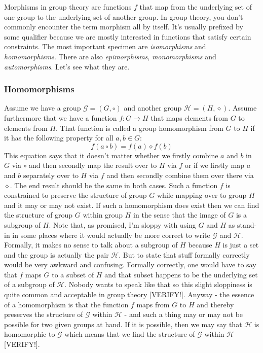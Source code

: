 Morphisms in group theory are functions $f$ that map from the underlying set of one group to the underlying set of another group. In group theory, you don't commonly encounter the term morphism all by itself. It's usually prefixed by some qualifier because we are mostly interested in functions that satisfy certain constraints. The most important specimen are \emph{isomorphisms} and \emph{homomorphisms}. There are also \emph{epimorphisms}, \emph{monomorphisms} and \emph{automorphisms}. Let's see what they are.

\subsubsection{Homomorphisms}

Assume we have a group $\mathcal{G} = (G, \circ)$ and another group $\mathcal{H} = (H, \diamond)$. Assume furthermore that we have a function $f: G \rightarrow H$ that maps elements from $G$ to elements from $H$. That function is called a group homomorphism from $G$ to $H$ if it has the following property for all $a,b \in G$:
\begin{equation}
	f(a \circ b) = f(a) \diamond f(b)
\end{equation}
This equation says that it doesn't matter whether we firstly combine $a$ and $b$ in $G$ via $\circ$ and then secondly map the result over to $H$ via $f$ or if we firstly map $a$ and $b$ separately over to $H$ via $f$ and then secondly combine them over there via $\diamond$. The end result should be the same in both cases. Such a function $f$ is constrained to preserve the structure of group $G$ while mapping over to group $H$ and it may or may not exist. If such a homomorphism does exist then we can find the structure of group $G$ within group $H$ in the sense that the image of $G$ is a subgroup of $H$. Note that, as promised, I'm sloppy with using $G$ and $H$ as stand-in in some places where it would actually be more correct to write $\mathcal{G}$ and $\mathcal{H}$. Formally, it makes no sense to talk about a subgroup of $H$ because $H$ is just a set and the group is actually the pair $\mathcal{H}$. But to state that stuff formally correctly would be very awkward and confusing. Formally correctly, one would have to say that $f$ maps $G$ to a subset of $H$ and that subset happens to be the underlying set of a subgroup of $\mathcal{H}$. Nobody wants to speak like that so this slight sloppiness is quite common and acceptable in group theory [VERIFY!]. Anyway - the essence of a homomorphism is that the function $f$ maps from $G$ to $H$ and thereby preserves the structure of $\mathcal{G}$ within $\mathcal{H}$ - and such a thing may or may not be possible for two given groups at hand. If it is possible, then we may say that $\mathcal{H}$ is homomorphic to $\mathcal{G}$ which means that we find the structure of $\mathcal{G}$ within $\mathcal{H}$ [VERIFY!].

